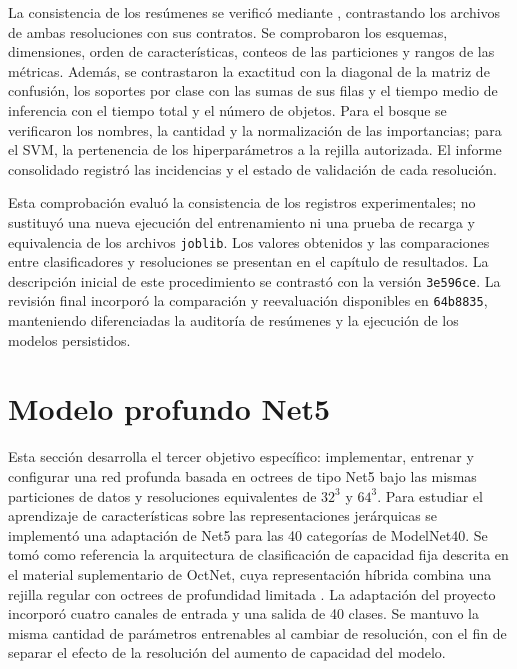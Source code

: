 La consistencia de los resúmenes se verificó mediante \protect{}, contrastando los archivos de ambas resoluciones con sus contratos. Se comprobaron los esquemas, dimensiones, orden de características, conteos de las particiones y rangos de las métricas. Además, se contrastaron la exactitud con la diagonal de la matriz de confusión, los soportes por clase con las sumas de sus filas y el tiempo medio de inferencia con el tiempo total y el número de objetos. Para el bosque se verificaron los nombres, la cantidad y la normalización de las importancias; para el SVM, la pertenencia de los hiperparámetros a la rejilla autorizada. El informe consolidado registró las incidencias y el estado de validación de cada resolución.

Esta comprobación evaluó la consistencia de los registros experimentales; no sustituyó una nueva ejecución del entrenamiento ni una prueba de recarga y equivalencia de los archivos \texttt{joblib}. Los valores obtenidos y las comparaciones entre clasificadores y resoluciones se presentan en el capítulo de resultados. La descripción inicial de este procedimiento se contrastó con la versión \texttt{3e596ce}. La revisión final incorporó la comparación y reevaluación disponibles en \texttt{64b8835}, manteniendo diferenciadas la auditoría de resúmenes y la ejecución de los modelos persistidos.


\section{Modelo profundo Net5}
\label{sec:net5-metodologia}

Esta sección desarrolla el tercer objetivo específico: implementar, entrenar y configurar una red profunda basada en octrees de tipo Net5 bajo las mismas particiones de datos y resoluciones equivalentes de $32^3$ y $64^3$. Para estudiar el aprendizaje de características sobre las representaciones jerárquicas se implementó una adaptación de Net5 para las 40 categorías de ModelNet40. Se tomó como referencia la arquitectura de clasificación de capacidad fija descrita en el material suplementario de OctNet, cuya representación híbrida combina una rejilla regular con octrees de profundidad limitada \parencite{riegler2017}. La adaptación del proyecto incorporó cuatro canales de entrada y una salida de 40 clases. Se mantuvo la misma cantidad de parámetros entrenables al cambiar de resolución, con el fin de separar el efecto de la resolución del aumento de capacidad del modelo.

